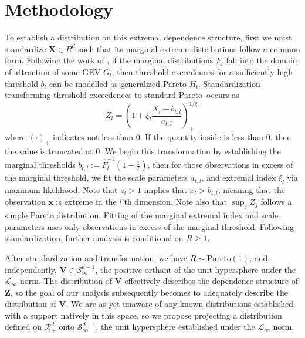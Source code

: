 \section{Methodology}
\label{sec:methodology}
To establish a distribution on this extremal dependence structure, first we must standardize $\bm{X} \in R^d$
  such that its marginal extreme distributions follow a common form.  Following the work of
  \cite{ferreira2014}, if the marginal distributions $F_{l}$ fall into the domain
  of attraction of some GEV $G_l$, then threshold exceedences for a sufficiently high threshold $b_{l}$
  can be modelled as generalized Pareto $H_l$.  Standardization--transforming threshold exceedences to
  standard Pareto--occurs as
  \begin{equation}
    \label{eqn:standardization}
    Z_l = \left(1 + \xi_l\frac{X_l - b_{t,l}}{a_{t,l}}\right)_{+}^{1/\xi_l}
  \end{equation}
  where $(\cdot)_{+}$ indicates not less than 0. If the quantity inside is less than 0, then the value
  is truncated at 0.  We begin this transformation by establishing the
  marginal thresholds $b_{t,l} := \hat{F}_l^{-1}\left(1 - \frac{1}{t}\right)$, then for those observations
  in excess of the marginal threshold, we fit the scale parameters $a_{t,l}$, and extremal index $\xi_l$
  via maximum likelihood. Note that $z_l > 1$ implies that $x_l > b_{t,l}$, meaning that the observation
  $\bm{x}$ is extreme in the $l$'th dimension.  Note also that $\sup_j Z_j$ follows a simple Pareto
  distribution. Fitting of the marginal extremal index and scale parameters uses only observations in
  excess of the marginal threshold. Following standardization, further analysis is conditional on
  $R \geq 1$.

After standardization and transformation, we have $R\sim\text{Pareto}(1)$, and, independently,
  $\bm{V}\in\mathcal{S}_{\infty}^{d-1}$, the positive orthant of the unit hypersphere under the
  $\mathcal{L}_{\infty}$ norm.  The distribution of $\bm{V}$ effectively describes the dependence
  structure of $\bm{Z}$, so the goal of our analysis subsequently becomes to adequately describe the
  distribution of $\bm{V}$.  We are as yet unaware of any known distributions established with a support
  natively in this space, so we propose projecting a distribution defined on $\mathcal{R}_{+}^{d}$ onto
  $\mathcal{S}_{\infty}^{d-1}$, the unit hypersphere established under the $\mathcal{L}_{\infty}$ norm.









